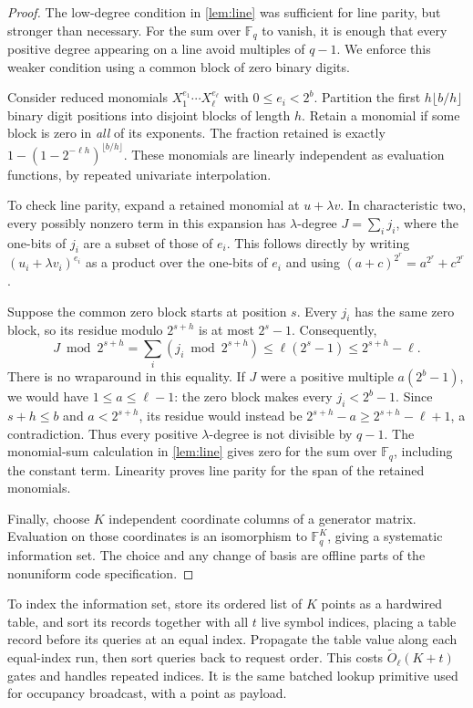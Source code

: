 \documentclass[11pt]{article}
\newcommand{\F}{\mathbb{F}}
\begin{document}
\begin{proof}
The low-degree condition in \cref{lem:line} was sufficient for line parity,
but stronger than necessary.  For the sum over $\F_q$ to vanish, it is enough
that every positive degree appearing on a line avoid multiples of $q-1$.
We enforce this weaker condition using a common block of zero binary digits.

Consider reduced monomials $X_1^{e_1}\cdots X_\ell^{e_\ell}$ with
$0\le e_i<2^b$.  Partition the first $h\lfloor b/h\rfloor$ binary digit
positions into disjoint blocks of length $h$.  Retain a monomial if some block
is zero in \emph{all} of its exponents.  The fraction retained is exactly
$1-(1-2^{-\ell h})^{\lfloor b/h\rfloor}$.  These monomials are linearly
independent as evaluation functions, by repeated univariate interpolation.

To check line parity, expand a retained monomial at $u+\lambda v$.  In
characteristic two, every possibly nonzero term in this expansion has
$\lambda$-degree $J=\sum_i j_i$, where the one-bits of $j_i$ are a subset of
those of $e_i$.  This follows directly by writing
$(u_i+\lambda v_i)^{e_i}$ as a product over the one-bits of $e_i$ and using
$(a+c)^{2^r}=a^{2^r}+c^{2^r}$.

Suppose the common zero block starts at position $s$.  Every $j_i$ has the
same zero block, so its residue modulo $2^{s+h}$ is at most $2^s-1$.
Consequently,
\[
  J\bmod 2^{s+h}=\sum_i(j_i\bmod2^{s+h})
       \le\ell(2^s-1)\le2^{s+h}-\ell.
\]
There is no wraparound in this equality.  If $J$ were a positive multiple
$a(2^b-1)$, we would have $1\le a\le\ell-1$: the zero block makes every
$j_i<2^b-1$.  Since $s+h\le b$ and $a<2^{s+h}$, its residue would instead
be $2^{s+h}-a\ge2^{s+h}-\ell+1$, a contradiction.  Thus every positive
$\lambda$-degree is not divisible by $q-1$.  The monomial-sum calculation in
\cref{lem:line} gives zero for the sum over $\F_q$, including the constant
term.  Linearity proves line parity for the span of the retained monomials.

Finally, choose $K$ independent coordinate columns of a generator matrix.
Evaluation on those coordinates is an isomorphism to $\F_q^K$, giving a
systematic information set.  The choice and any change of basis are offline
parts of the nonuniform code specification.
\end{proof}

To index the information set, store its ordered list of $K$ points as a
hardwired table, and sort its records together with all $t$ live symbol
indices, placing a table record
before its queries at an equal index.  Propagate the table value along each
equal-index run, then sort queries back to request order.  This costs
$\widetilde O_\ell(K+t)$ gates and handles repeated indices.  It is the same
batched lookup primitive used for occupancy broadcast, with a point as payload.
\end{document}
